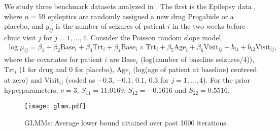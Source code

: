 \documentclass{statsoc}
\begin{document}
We study three benchmark datasets analyzed in \cite{Tan2021}. The first is the Epilepsy data \citep{Thall1990}, where $n=59$ epileptics are randomly assigned a new drug Progabide or a placebo, and $y_{ij}$ is the number of seizures of patient $i$ in the two weeks before clinic visit $j$ for $j=1, \dots, 4$. Consider the Poisson random slope model,
\begin{align*}
\log \mu_{ij} = \beta_1+\beta_2 \text{Base}_i+\beta_3 \text{Trt}_i + \beta_4 \text{Base}_i \times \text{Trt}_i +\beta_5 \text{Age}_i +\beta_6 \text{Visit}_{ij} +b_{i1} + b_{i2} \text{Visit}_{ij},
\end{align*}
where the covariates for patient $i$ are $\text{Base}_i$ (log(number of baseline seizures/4)), $\text{Trt}_i$  (1 for drug and 0 for placebo), $\text{Age}_i$ (log(age of patient at baseline) centered at zero) and $\text{Visit}_{ij}$ (coded as $-0.3$, $-0.1$, $0.1$, $0.3$ for $j=1, \dots, 4$). For the prior hyperparameters, $\nu = 3$, $S_{11} = 11.0169$, $S_{12} = -0.1616$ and $S_{22} = 0.5516$.

\begin{figure}[b!]
\centering 
\texttt{[image: glmm.pdf]}
\caption{GLMMs: Average lower bound attained over past 1000 iterations.}
\label{Fig4}
\end{figure}
\end{document}

